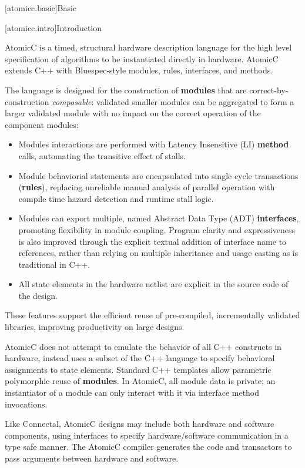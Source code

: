 [atomicc.basic]{Basic}

[atomicc.intro]{Introduction}

AtomicC is a timed, structural hardware description language for
the high level specification of algorithms to be instantiated
directly in hardware.
AtomicC extends C++
with Bluespec-style\cite{Bluespec:www,Hoe:Thesis,HoeArvind:TRS_Synthesis2}
modules, rules, interfaces, and methods.

The language is designed for
the construction of \textbf{modules} that are correct-by-construction \textit{composable}:
validated smaller modules can be aggregated to form
a larger validated module with no impact on the correct
operation of the component modules:
\begin{itemize}
\item Modules interactions are performed with Latency Insensitive (LI) \textbf{method} calls, automating the transitive effect of stalls.
\item Module behaviorial statements are encapsulated into single cycle transactions (\textbf{rules}),
replacing unreliable manual analysis of parallel operation
with compile time hazard detection and runtime stall logic.
\item Modules can export multiple, named Abstract Data Type (ADT) \textbf{interfaces},
promoting flexibility in module coupling.  Program clarity and expressiveness is
also improved through the explicit textual addition of interface name to references, rather
than relying on multiple inheritance and usage casting as is traditional in C++.
\item All state elements in the hardware
netlist are explicit in the source code of the design.
\end{itemize}
These features support the efficient reuse of pre-compiled, incrementally validated
libraries, improving productivity on large designs.

AtomicC does not attempt to emulate the behavior of all C++ constructs in hardware,
instead uses a subset of the C++ language to specify behavioral
assignments to state elements.
Standard C++ templates allow parametric polymorphic reuse of \textbf{modules}.
In AtomicC, all module data is private; an instantiator of a module can only 
interact with it via interface method invocations.

Like Connectal, AtomicC designs may include both hardware and
software components, using interfaces to specify hardware/software communication
in a type safe manner. The AtomicC compiler generates the code and transactors to pass
arguments between hardware and software.

